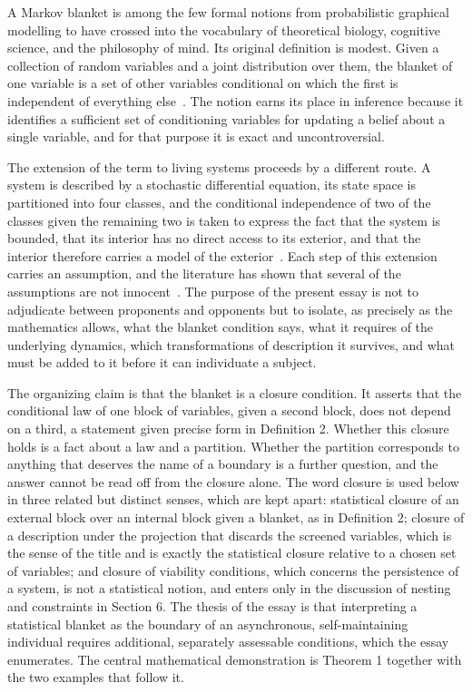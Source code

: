 \documentclass[11pt]{article}
\theoremstyle{definition}
\begin{document}
A Markov blanket is among the few formal notions from probabilistic graphical modelling to have crossed into the vocabulary of theoretical biology, cognitive science, and the philosophy of mind. Its original definition is modest. Given a collection of random variables and a joint distribution over them, the blanket of one variable is a set of other variables conditional on which the first is independent of everything else~\cite{pearl1988}. The notion earns its place in inference because it identifies a sufficient set of conditioning variables for updating a belief about a single variable, and for that purpose it is exact and uncontroversial.

The extension of the term to living systems proceeds by a different route. A system is described by a stochastic differential equation, its state space is partitioned into four classes, and the conditional independence of two of the classes given the remaining two is taken to express the fact that the system is bounded, that its interior has no direct access to its exterior, and that the interior therefore carries a model of the exterior~\cite{friston2013,friston2019,kirchhoff2018}. Each step of this extension carries an assumption, and the literature has shown that several of the assumptions are not innocent~\cite{biehl2021,aguilera2022,raja2021,bruineberg2022}. The purpose of the present essay is not to adjudicate between proponents and opponents but to isolate, as precisely as the mathematics allows, what the blanket condition says, what it requires of the underlying dynamics, which transformations of description it survives, and what must be added to it before it can individuate a subject.

The organizing claim is that the blanket is a closure condition. It asserts that the conditional law of one block of variables, given a second block, does not depend on a third, a statement given precise form in Definition 2. Whether this closure holds is a fact about a law and a partition. Whether the partition corresponds to anything that deserves the name of a boundary is a further question, and the answer cannot be read off from the closure alone. The word closure is used below in three related but distinct senses, which are kept apart: statistical closure of an external block over an internal block given a blanket, as in Definition 2; closure of a description under the projection that discards the screened variables, which is the sense of the title and is exactly the statistical closure relative to a chosen set of variables; and closure of viability conditions, which concerns the persistence of a system, is not a statistical notion, and enters only in the discussion of nesting and constraints in Section 6. The thesis of the essay is that interpreting a statistical blanket as the boundary of an asynchronous, self-maintaining individual requires additional, separately assessable conditions, which the essay enumerates. The central mathematical demonstration is Theorem 1 together with the two examples that follow it.
\end{document}
